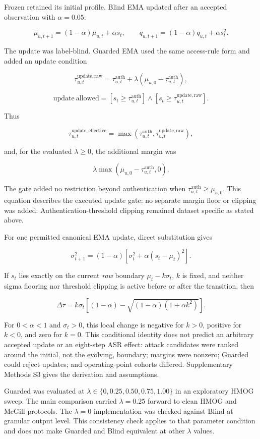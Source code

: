 \documentclass[technologies,article,submit,moreauthors]{Definitions/mdpi}
\begin{document}
Frozen retained its initial profile. Blind EMA updated after an accepted observation with \(\alpha=0.05\):

\[
\mu_{u,t+1}=(1-\alpha)\mu_{u,t}+\alpha s_t,
\qquad
q_{u,t+1}=(1-\alpha)q_{u,t}+\alpha s_t^2.
\]

The update was label-blind. Guarded EMA used the same access-rule form and added an update condition

\[
\tau^{\mathrm{update,raw}}_{u,t}
=\tau^{\mathrm{auth}}_{u,t}+\lambda(\mu_{u,0}-\tau^{\mathrm{auth}}_{u,t}),
\]

\[
\mathrm{update\ allowed}
=\left[s_t\geq\tau^{\mathrm{auth}}_{u,t}\right]
\land
\left[s_t\geq\tau^{\mathrm{update,raw}}_{u,t}\right].
\]

Thus

\[
\tau^{\mathrm{update,effective}}_{u,t}
=\max(\tau^{\mathrm{auth}}_{u,t},\tau^{\mathrm{update,raw}}_{u,t}),
\]

and, for the evaluated \(\lambda\geq0\), the additional margin was

\[
\lambda\max(\mu_{u,0}-\tau^{\mathrm{auth}}_{u,t},0).
\]

The gate added no restriction beyond authentication when \(\tau^{\mathrm{auth}}_{u,t}\geq\mu_{u,0}\). This equation describes the executed update gate: no separate margin floor or clipping was added. Authentication-threshold clipping remained dataset specific as stated above.

For one permitted canonical EMA update, direct substitution gives

\[
\sigma_{t+1}^2=(1-\alpha)\left[\sigma_t^2+\alpha(s_t-\mu_t)^2\right].
\]

If \(s_t\) lies exactly on the current \emph{raw} boundary \(\mu_t-k\sigma_t\), \(k\) is fixed, and neither sigma flooring nor threshold clipping is active before or after the transition, then

\[
\Delta\tau=k\sigma_t\!\left[(1-\alpha)-\sqrt{(1-\alpha)(1+\alpha k^2)}\right].
\]

For \(0<\alpha<1\) and \(\sigma_t>0\), this local change is negative for \(k>0\), positive for \(k<0\), and zero for \(k=0\). This conditional identity does not predict an arbitrary accepted update or an eight-step ASR effect: attack candidates were ranked around the initial, not the evolving, boundary; margins were nonzero; Guarded could reject updates; and operating-point cohorts differed. Supplementary Methods S3 gives the derivation and assumptions.

Guarded was evaluated at \(\lambda\in\{0,0.25,0.50,0.75,1.00\}\) in an exploratory HMOG sweep. The main comparison carried \(\lambda=0.25\) forward to clean HMOG and McGill protocols. The \(\lambda=0\) implementation was checked against Blind at granular output level. This consistency check applies to that parameter condition and does not make Guarded and Blind equivalent at other \(\lambda\) values.
\end{document}
